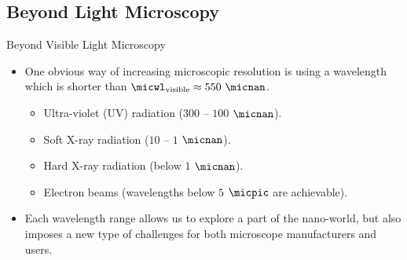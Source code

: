 \subsection{Beyond Light Microscopy}%
\label{sub:beyond_light_microscopy}


\begin{frame}[c]{Beyond Visible Light Microscopy}
	\begin{itemize}
		\setlength\itemsep{0.4cm}
		\item<1-> One obvious way of increasing microscopic resolution is using a wavelength which is shorter than $\micwl_{\text{visible}} \approx 550~\micnan$.
		      \vspace{0.3cm}
		      \begin{itemize}
			      \setlength\itemsep{0.3cm}
			      \item<2-> Ultra-violet (UV) radiation ($300$ -- $100$ $\micnan$).
			      \item<3-> Soft X-ray radiation ($10$ -- $1$ $\micnan$).
			      \item<4-> Hard X-ray radiation (below $1$ $\micnan$).
			      \item<5-> Electron beams (wavelengths below $5$ $\micpic$ are achievable).
		      \end{itemize}
		\item<6-> Each wavelength range allows us to explore a part of the nano-world, but also imposes a new type of challenges for both microscope manufacturers and users.
	\end{itemize}
\end{frame}
